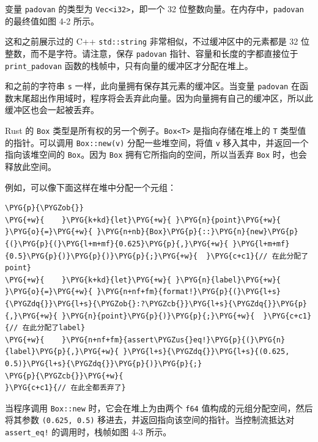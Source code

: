 变量 \texttt{padovan} 的类型为 \texttt{Vec<i32>}，即一个 32 位整数向量。在内存中，\texttt{padovan} 的最终值如图 4-2 所示。


这和之前展示过的 C++ \texttt{std::string} 非常相似，不过缓冲区中的元素都是 32 位整数，而不是字符。请注意，保存 \texttt{padovan} 指针、容量和长度的字都直接位于 \texttt{print\_padovan} 函数的栈帧中，只有向量的缓冲区才分配在堆上。

和之前的字符串 \texttt{s} 一样，此向量拥有保存其元素的缓冲区。当变量 \texttt{padovan} 在函数末尾超出作用域时，程序将会丢弃此向量。因为向量拥有自己的缓冲区，所以此缓冲区也会一起被丢弃。

Rust 的 \texttt{Box} 类型是所有权的另一个例子。\texttt{Box<T>} 是指向存储在堆上的 \texttt{T} 类型值的指针。可以调用 \texttt{Box::new(v)} 分配一些堆空间，将值 \texttt{v} 移入其中，并返回一个指向该堆空间的 \texttt{Box}。因为 \texttt{Box} 拥有它所指向的空间，所以当丢弃 \texttt{Box} 时，也会释放此空间。

例如，可以像下面这样在堆中分配一个元组：

\begin{Verbatim}[commandchars=\\\{\},breaklines=true,breakanywhere=true,fontsize=\codefont,xleftmargin=17bp]
\PYG{p}{\PYGZob{}}
\PYG{+w}{    }\PYG{k+kd}{let}\PYG{+w}{ }\PYG{n}{point}\PYG{+w}{ }\PYG{o}{=}\PYG{+w}{ }\PYG{n+nb}{Box}\PYG{p}{::}\PYG{n}{new}\PYG{p}{(}\PYG{p}{(}\PYG{l+m+mf}{0.625}\PYG{p}{,}\PYG{+w}{ }\PYG{l+m+mf}{0.5}\PYG{p}{)}\PYG{p}{)}\PYG{p}{;}\PYG{+w}{  }\PYG{c+c1}{// 在此分配了point}
\PYG{+w}{    }\PYG{k+kd}{let}\PYG{+w}{ }\PYG{n}{label}\PYG{+w}{ }\PYG{o}{=}\PYG{+w}{ }\PYG{n+nf+fm}{format!}\PYG{p}{(}\PYG{l+s}{\PYGZdq{}}\PYG{l+s}{\PYGZob{}:?\PYGZcb{}}\PYG{l+s}{\PYGZdq{}}\PYG{p}{,}\PYG{+w}{ }\PYG{n}{point}\PYG{p}{)}\PYG{p}{;}\PYG{+w}{  }\PYG{c+c1}{// 在此分配了label}
\PYG{+w}{    }\PYG{n+nf+fm}{assert\PYGZus{}eq!}\PYG{p}{(}\PYG{n}{label}\PYG{p}{,}\PYG{+w}{ }\PYG{l+s}{\PYGZdq{}}\PYG{l+s}{(0.625, 0.5)}\PYG{l+s}{\PYGZdq{}}\PYG{p}{)}\PYG{p}{;}
\PYG{p}{\PYGZcb{}}\PYG{+w}{                                        }\PYG{c+c1}{// 在此全都丢弃了}
\end{Verbatim}

当程序调用 \texttt{Box::new} 时，它会在堆上为由两个 \texttt{f64} 值构成的元组分配空间，然后将其参数 \texttt{(0.625, 0.5)} 移进去，并返回指向该空间的指针。当控制流抵达对 \texttt{assert\_eq!} 的调用时，栈帧如图 4-3 所示。


